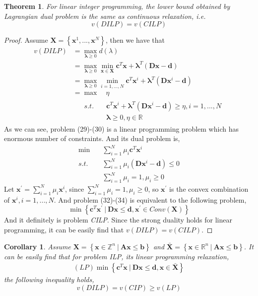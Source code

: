 \documentclass{article}
\newtheorem{thm}{Theorem}
\newtheorem{coro}{Corollary}
\begin{document}
\begin{thm}
	For linear integer programming, the lower bound obtained by Lagrangian dual problem is the same as continuous relaxation, i.e.
	\begin{equation}
		v(DILP) = v(CILP)
	\end{equation}
\end{thm}
\begin{proof}
	Assume $\bm{X} = \left\{\bm{x}^1, ..., \bm{x}^N\right\}$, then we have that
	\begin{align}
		v(DILP) &= \max_{\bm{\lambda} \geq 0} d(\lambda) \\
		&= \max_{\bm{\lambda} \geq 0} \min_{\bm{x} \in \bm{X}} \bm{c}^T\bm{x} + \bm{\lambda}^T(\bm{Dx} - \bm{d}) \\
		&= \max_{\bm{\lambda} \geq 0} \min_{i = 1 , ... , N} \bm{c}^T\bm{x}^i + \bm{\lambda}^T(\bm{D}\bm{x}^i - \bm{d}) \\
		& = \max \quad \eta \\
		& \quad \ \begin{aligned}
		s.t. \quad& \bm{c}^T\bm{x}^i + \bm{\lambda}^T(\bm{D}\bm{x}^i - \bm{d}) \geq \eta , i = 1, ..., N\\
		& \bm{\lambda} \geq 0, \eta \in \mathbb{R}
		\end{aligned} 
	\end{align}
	As we can see, problem (29)-(30) is a linear programming problem which has enormous number of constraints. And its dual problem is,
	\begin{align}
	\min \quad & \sum_{i=1}^{N}\mu_i \bm{c}^T\bm{x}^i \\
	s.t. \quad & \sum_{i=1}^{N}\mu_i(\bm{D}\bm{x}^i - \bm{d}) \leq 0 \\
	& \sum_{i=1}^{N}\mu_i = 1, \mu_i \geq 0
	\end{align}
	Let $\bm{x}^\prime = \sum_{i=1}^{N} \mu_i \bm{x}^i$, since $\sum_{i=1}^{N} \mu_i = 1, \mu_i \geq 0$, so $\bm{x}^\prime$ is the convex combination of $\bm{x}^i, i =1, ..., N$. And problem (32)-(34) is equivalent to the following problem,
	\begin{equation}
		\min \left\{\bm{c}^T\bm{x}^\prime \ | \ \bm{D}\bm{x} \leq \bm{d}, \bm{x}^\prime \in Conv(\bm{X})\right\}
	\end{equation}
	And it definitely is problem \textit{CILP}. Since the strong duality holds for linear programming, it can be easily find that $v(DILP) = v(CILP)$.
\end{proof}

\begin{coro}
	Assume $\bm{X} = \left\{\bm{x} \in \mathbb{Z}^n \ | \ \bm{Ax} \leq \bm{b} \right\}$ and $\bar{\bm{X}} = \left\{ \bm{x} \in \mathbb{R}^n \ | \ \bm{Ax} \leq \bm{b} \right\}$. It can be easily find that for problem \textit{ILP}, its linear programming relaxation,
	\begin{align}
		(\textit{LP})\min \left\{\bm{c}^T\bm{x} \ | \ \bm{Dx} \leq \bm{d}, \bm{x} \in \bar{\bm{X}}\right\}
	\end{align}
	the following inequality holds,
	\begin{equation}
		v(DILP) = v(CIP) \geq v(LP)
	\end{equation}
\end{coro}
 
\end{document}
